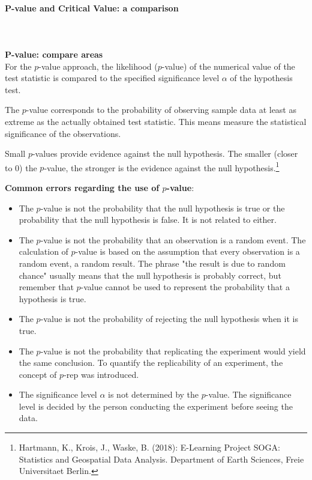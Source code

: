 \documentclass{article}
\begin{document}
\paragraph{P-value and Critical Value: a comparison}\mbox{} \\
\mbox{} \\
\textbf{P-value: compare areas}\\
For the $p$-value approach, the likelihood ($p$-value) of the numerical value of the test statistic is compared to the specified significance level $\alpha$ of the hypothesis test.

The $p$-value corresponds to the probability of observing sample data at least as extreme as the actually obtained test statistic. This means measure the statistical significance of the observations. 

Small $p$-values provide evidence against the null hypothesis. The smaller (closer to 0) the $p$-value, the stronger is the evidence against the null hypothesis.\footnote{Hartmann, K., Krois, J., Waske, B. (2018): E-Learning Project SOGA: Statistics and Geospatial Data Analysis. Department of Earth Sciences, Freie Universitaet Berlin.}

\textbf{Common errors regarding the use of $p$-value}:
\begin{itemize}
    \item The $p$-value is not the probability that the null hypothesis is true or the probability that the null hypothesis is false. It is not related to either.
    \item The $p$-value is not the probability that an observation is a random event. The calculation of $p$-value is based on the assumption that every observation is a random event, a random result. The phrase "the result is due to random chance" usually means that the null hypothesis is probably correct, but remember that $p$-value cannot be used to represent the probability that a hypothesis is true.
    \item The $p$-value is not the probability of rejecting the null hypothesis when it is true.
    \item The $p$-value is not the probability that replicating the experiment would yield the same conclusion. To quantify the replicability of an experiment, the concept of $p$-rep was introduced.
    \item The significance level $\alpha$ is not determined by the $p$-value. The significance level is decided by the person conducting the experiment before seeing the data.
\end{itemize}
\end{document}
